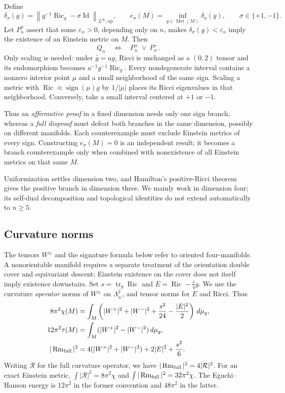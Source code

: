 \documentclass[a4paper,11pt]{article}
\numberwithin{equation}{section}
\theoremstyle{definition}
\newcommand{\Ric}{\operatorname{Ric}}
\newcommand{\Rm}{\operatorname{Rm}}
\newcommand{\tr}{\operatorname{tr}}
\newcommand{\Met}{\operatorname{Met}}
\newcommand{\Id}{\operatorname{Id}}
\newcommand{\op}{\mathrm{op}}
\newcommand{\dd}{\,d\mu_g}
\newcommand{\norm}[1]{\left\lVert#1\right\rVert}
\begin{document}
Define
\begin{equation}\label{eq:defect}
 \delta_\sigma(g)=\norm{g^{-1}\Ric_g-\sigma\Id}_{L^\infty,\op},\qquad
 e_\sigma(M)=\inf_{g\in\Met(M)}\delta_\sigma(g),\qquad \sigma\in\{+1,-1\}.
\end{equation}
Let $P_n^\sigma$ assert that some $\varepsilon_n>0$, depending only on $n$, makes $\delta_\sigma(g)<\varepsilon_n$ imply the existence of an Einstein metric on $M$. Then
\begin{equation}\label{eq:branches}
 Q_n\quad\Longleftrightarrow\quad P_n^+\ \lor\ P_n^-.
\end{equation}
Only scaling is needed: under $\widehat g=ag$, Ricci is unchanged as a $(0,2)$ tensor and its endomorphism becomes $a^{-1}g^{-1}\Ric_g$. Every nondegenerate interval contains a nonzero interior point $\mu$ and a small neighborhood of the same sign. Scaling a metric with $\Ric\approx\operatorname{sign}(\mu)g$ by $1/|\mu|$ places its Ricci eigenvalues in that neighborhood. Conversely, take a small interval centered at $+1$ or $-1$.

Thus an \emph{affirmative proof} in a fixed dimension needs only one sign branch, whereas a \emph{full disproof} must defeat both branches in the same dimension, possibly on different manifolds. Each counterexample must exclude Einstein metrics of every sign. Constructing $e_\sigma(M)=0$ is an independent result; it becomes a branch counterexample only when combined with nonexistence of all Einstein metrics on that same $M$.

Uniformization settles dimension two, and Hamilton's positive-Ricci theorem gives the positive branch in dimension three. We mainly work in dimension four; its self-dual decomposition and topological identities do not extend automatically to $n\ge5$.

\subsection{Curvature norms}
The tensors $W^\pm$ and the signature formula below refer to oriented four-manifolds. A nonorientable manifold requires a separate treatment of the orientation double cover and equivariant descent; Einstein existence on the cover does not itself imply existence downstairs. Set $s=\tr_g\Ric$ and $E=\Ric-\frac{s}{4}g$. We use the curvature \emph{operator} norms of $W^\pm$ on $\Lambda^2_\pm$, and tensor norms for $E$ and Ricci. Thus
\begin{align}
8\pi^2\chi(M)&=\int_M\left(|W^+|^2+|W^-|^2+\frac{s^2}{24}-\frac{|E|^2}{2}\right)\dd,\label{eq:CGB}\\
12\pi^2\tau(M)&=\int_M(|W^+|^2-|W^-|^2)\dd,\label{eq:signature}\\
|\Rm_{\rm full}|^2&=4(|W^+|^2+|W^-|^2)+2|E|^2+\frac{s^2}{6}.
\end{align}
Writing $\mathcal R$ for the full curvature operator, we have $|\Rm_{\rm full}|^2=4|\mathcal R|^2$. For an exact Einstein metric, $\int|\mathcal R|^2=8\pi^2\chi$ and $\int|\Rm_{\rm full}|^2=32\pi^2\chi$. The Eguchi--Hanson energy is $12\pi^2$ in the former convention and $48\pi^2$ in the latter.
\end{document}
